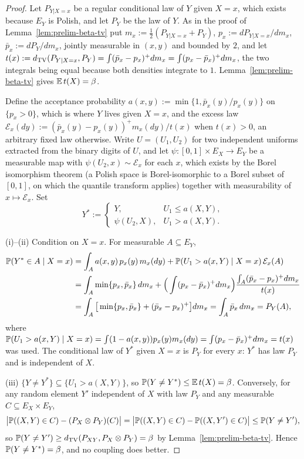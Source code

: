 \documentclass[../../main.tex]{subfiles}
\begin{document}
\begin{proof}
Let $P_{Y|X=x}$ be a regular conditional law of $Y$ given $X=x$, which exists because $E_Y$ is Polish, and let $P_Y$ be the law of $Y$. As in the proof of Lemma~\ref{lem:prelim-beta-tv} put $m_x:=\tfrac12(P_{Y|X=x}+P_Y)$, $p_x:=dP_{Y|X=x}/dm_x$, $\bar p_x:=dP_Y/dm_x$, jointly measurable in $(x,y)$ and bounded by $2$, and let $t(x):=d_{\mathrm{TV}}(P_{Y|X=x},P_Y)=\int(\bar p_x-p_x)^+dm_x=\int(p_x-\bar p_x)^+dm_x$, the two integrals being equal because both densities integrate to $1$. Lemma~\ref{lem:prelim-beta-tv} gives $\mathbb{E}\,t(X)=\beta$.

Define the acceptance probability $a(x,y):=\min\{1,\bar p_x(y)/p_x(y)\}$ on $\{p_x>0\}$, which is where $Y$ lives given $X=x$, and the excess law $\mathcal E_x(dy):=(\bar p_x(y)-p_x(y))^+m_x(dy)/t(x)$ when $t(x)>0$, an arbitrary fixed law otherwise. Write $U=(U_1,U_2)$ for two independent uniforms extracted from the binary digits of $U$, and let $\psi:[0,1]\times E_X\to E_Y$ be a measurable map with $\psi(U_2,x)\sim\mathcal E_x$ for each $x$, which exists by the Borel isomorphism theorem (a Polish space is Borel-isomorphic to a Borel subset of $[0,1]$, on which the quantile transform applies) together with measurability of $x\mapsto\mathcal E_x$. Set
\[
Y^*:=\begin{cases}Y,&U_1\le a(X,Y),\\ \psi(U_2,X),&U_1>a(X,Y).\end{cases}
\]

(i)--(ii) Condition on $X=x$. For measurable $A\subseteq E_Y$,
\begin{align*}
\mathbb{P}(Y^*\in A\mid X=x)&=\int_A a(x,y)\,p_x(y)\,m_x(dy)+\mathbb{P}(U_1>a(x,Y)\mid X=x)\,\mathcal E_x(A)\\
&=\int_A\min\{p_x,\bar p_x\}\,dm_x+\Big(\int(p_x-\bar p_x)^+dm_x\Big)\frac{\int_A(\bar p_x-p_x)^+dm_x}{t(x)}\\
&=\int_A\big[\min\{p_x,\bar p_x\}+(\bar p_x-p_x)^+\big]dm_x=\int_A\bar p_x\,dm_x=P_Y(A),
\end{align*}
where $\mathbb{P}(U_1>a(x,Y)\mid X=x)=\int(1-a(x,y))p_x(y)m_x(dy)=\int(p_x-\bar p_x)^+dm_x=t(x)$ was used. The conditional law of $Y^*$ given $X=x$ is $P_Y$ for every $x$: $Y^*$ has law $P_Y$ and is independent of $X$.

(iii) $\{Y\ne Y^*\}\subseteq\{U_1>a(X,Y)\}$, so $\mathbb{P}(Y\ne Y^*)\le\mathbb{E}\,t(X)=\beta$. Conversely, for any random element $Y'$ independent of $X$ with law $P_Y$ and any measurable $C\subseteq E_X\times E_Y$,
\[
\big|\mathbb{P}((X,Y)\in C)-(P_X\otimes P_Y)(C)\big|=\big|\mathbb{P}((X,Y)\in C)-\mathbb{P}((X,Y')\in C)\big|\le\mathbb{P}(Y\ne Y'),
\]
so $\mathbb{P}(Y\ne Y')\ge d_{\mathrm{TV}}(P_{XY},P_X\otimes P_Y)=\beta$ by Lemma~\ref{lem:prelim-beta-tv}. Hence $\mathbb{P}(Y\ne Y^*)=\beta$, and no coupling does better.
\end{proof}
\end{document}
